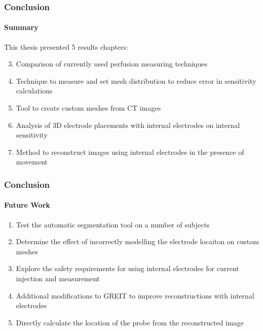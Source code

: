 \documentclass[10pt,    %
    english,            %
    xcolor=table,       %
    envcountsect,        %
    aspectratio=1610
]{beamer}
\begin{document}
\begin{frame}
\frametitle{Conclusion}
\framesubtitle{Summary}
This thesis presented 5 results chapters:
\vspace{2mm}
\begin{enumerate}
	\setcounter{enumi}{2}
	\item Comparison of currently used perfusion measuring techniques
	\vspace{2mm}
	\item Technique to measure and set mesh distribution to reduce error in sensitivity calculations
	\vspace{2mm}
	\item Tool to create custom meshes from CT images
	\vspace{2mm}
	\item Analysis of 3D electrode placements with internal electrodes on internal sensitivity 
	\vspace{2mm}
	\item Method to reconstruct images using internal electrodes in the presence of movement 
\end{enumerate}
\end{frame}

\begin{frame}
\frametitle{Conclusion}
\framesubtitle{Future Work}
\begin{enumerate}
	\item Test the automatic segmentation tool on a number of subjects 
	\vspace{2mm}
	\item Determine the effect of incorrectly modelling the electrode locaiton on custom meshes
	\vspace{2mm}
	\item Explore the safety requirements for using internal electrodes for current injection and measurement 
	\vspace{2mm}
	\item Additional modifications to GREIT to improve reconstructions with internal electrodes
	\vspace{2mm}
	\item Directly calculate the location of the probe from the reconstructed image
\end{enumerate}

\end{frame}

\begin{frame}
  \titlepage
\end{frame}

\end{document}
